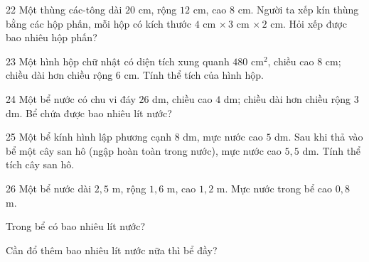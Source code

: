 \gap
\begin{probbox}{22}{\relax}
Một thùng các-tông dài $20$ cm, rộng $12$ cm, cao $8$ cm. Người ta xếp kín thùng bằng các hộp phấn, mỗi hộp có kích thước $4$ cm $\times\,3$ cm $\times\,2$ cm. Hỏi xếp được bao nhiêu hộp phấn?
\end{probbox}
\gap
\begin{probbox}{23}{\relax}
Một hình hộp chữ nhật có diện tích xung quanh $480$ cm$^2$, chiều cao $8$ cm; chiều dài hơn chiều rộng $6$ cm. Tính thể tích của hình hộp.
\end{probbox}
\gap
\begin{probbox}{24}{\relax}
Một bể nước có chu vi đáy $26$ dm, chiều cao $4$ dm; chiều dài hơn chiều rộng $3$ dm. Bể chứa được bao nhiêu lít nước?
\end{probbox}
\gap
\begin{probbox}{25}{\relax}
Một bể kính hình lập phương cạnh $8$ dm, mực nước cao $5$ dm. Sau khi thả vào bể một cây san hô (ngập hoàn toàn trong nước), mực nước cao $5{,}5$ dm. Tính thể tích cây san hô.
\end{probbox}
\gap
\begin{probbox}{26}{\relax}
Một bể nước dài $2{,}5$ m, rộng $1{,}6$ m, cao $1{,}2$ m. Mực nước trong bể cao $0{,}8$ m.\par
{} Trong bể có bao nhiêu lít nước?\par
{} Cần đổ thêm bao nhiêu lít nước nữa thì bể đầy?
\end{probbox}

